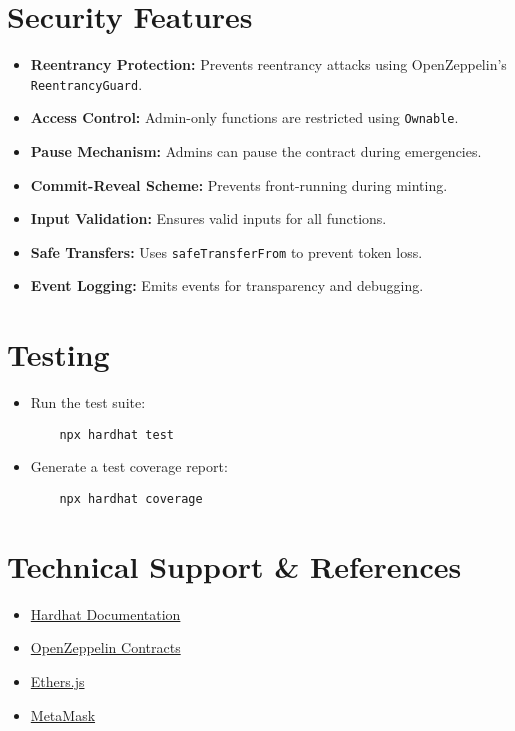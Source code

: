 \documentclass{article}
\begin{document}
\section{Security Features}
\begin{itemize}
    \item \textbf{Reentrancy Protection:} Prevents reentrancy attacks using OpenZeppelin's \texttt{ReentrancyGuard}.
    \item \textbf{Access Control:} Admin-only functions are restricted using \texttt{Ownable}.
    \item \textbf{Pause Mechanism:} Admins can pause the contract during emergencies.
    \item \textbf{Commit-Reveal Scheme:} Prevents front-running during minting.
    \item \textbf{Input Validation:} Ensures valid inputs for all functions.
    \item \textbf{Safe Transfers:} Uses \texttt{safeTransferFrom} to prevent token loss.
    \item \textbf{Event Logging:} Emits events for transparency and debugging.
\end{itemize}

\section{Testing}
\begin{itemize}
    \item Run the test suite:
    \begin{lstlisting}
    npx hardhat test
    \end{lstlisting}
    \item Generate a test coverage report:
    \begin{lstlisting}
    npx hardhat coverage
    \end{lstlisting}
\end{itemize}

\section{Technical Support \& References}
\begin{itemize}
    \item \href{https://hardhat.org/}{Hardhat Documentation}
    \item \href{https://docs.openzeppelin.com/contracts/}{OpenZeppelin Contracts}
    \item \href{https://docs.ethers.io/}{Ethers.js}
    \item \href{https://metamask.io/}{MetaMask}
\end{itemize}
\end{document}
